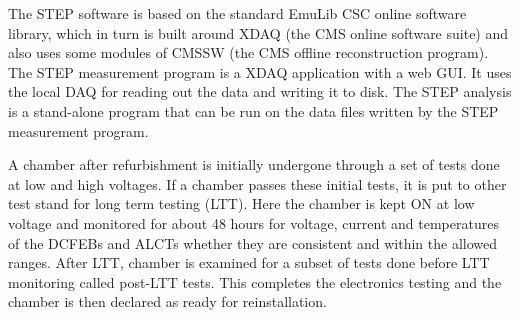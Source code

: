 The STEP software is based on the standard EmuLib CSC online software library, which in turn is built around XDAQ (the CMS online software suite) and also uses some modules of CMSSW (the CMS offline reconstruction program). The STEP measurement program is a XDAQ application with a web GUI. It uses the local DAQ for reading out the data and writing it to disk. The STEP analysis is a stand-alone program that can be run on the data files written by the STEP measurement program.

\par A chamber after refurbishment is initially undergone through a set of tests done at low and high voltages. If a chamber passes these initial tests, it is put to other test stand for long term testing (LTT). Here the chamber is kept ON at low voltage and monitored for about 48 hours for voltage, current and temperatures of the DCFEBs and ALCTs whether they are consistent and within the allowed ranges. After LTT, chamber is examined for a subset of tests done before LTT monitoring called post-LTT tests. This completes the electronics testing and the chamber is then declared as ready for reinstallation.


